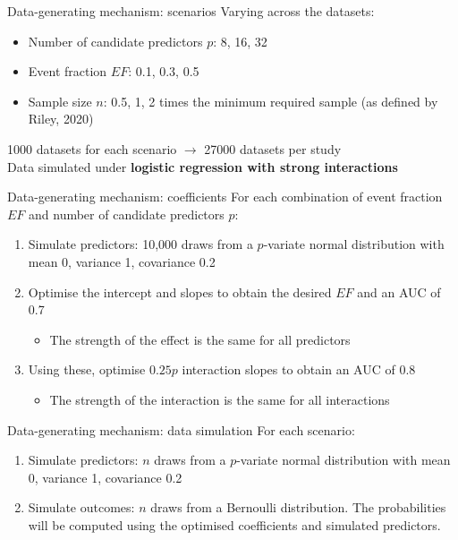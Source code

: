 \documentclass[aspectratio=169]{beamer} %
\begin{document}
\begin{frame}{Data-generating mechanism: scenarios}
    Varying across the datasets:\begin{itemize}
        \item Number of candidate predictors $p$: 8, 16, 32
        \item Event fraction $EF$: 0.1, 0.3, 0.5
        \item Sample size $n$: 0.5, 1, 2 times the minimum required sample (as defined by Riley, 2020)
    \end{itemize}
    1000 datasets for each scenario $\rightarrow$ 27000 datasets per study\\
    Data simulated under \textbf{logistic regression with strong interactions}
\end{frame}

\begin{frame}{Data-generating mechanism: coefficients}
    For each combination of event fraction $EF$ and number of candidate predictors $p$:\begin{enumerate}
        \item Simulate predictors: 10,000 draws from a $p$-variate normal distribution with mean 0, variance 1, covariance 0.2
        \item Optimise the intercept and slopes to obtain the desired $EF$ and an AUC of 0.7\begin{itemize}
            \item The strength of the effect is the same for all predictors
        \end{itemize}
        \item Using these, optimise $0.25p$ interaction slopes to obtain an AUC of 0.8\begin{itemize}
            \item The strength of the interaction is the same for all interactions
        \end{itemize}
    \end{enumerate}
\end{frame}

\begin{frame}{Data-generating mechanism: data simulation}
    For each scenario:\begin{enumerate}
        \item Simulate predictors: $n$ draws from a $p$-variate normal distribution with mean 0, variance 1, covariance 0.2
        \item Simulate outcomes: $n$ draws from a Bernoulli distribution. The probabilities will be computed using the optimised coefficients and simulated predictors.
    \end{enumerate}
\end{frame}
\end{document}

